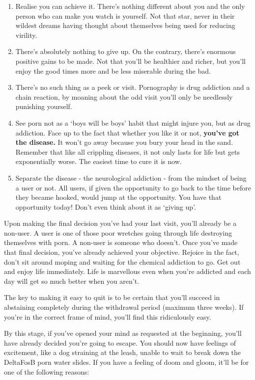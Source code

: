 \documentclass[
]{book}
\begin{document}
\begin{enumerate}
\def\labelenumi{\arabic{enumi}.}
\item
  Realise you can achieve it. There's nothing different about you and the only person who can make you watch is yourself. Not that star, never in their wildest dreams having thought about themselves being used for reducing virility.
\item
  There's absolutely nothing to give up. On the contrary, there's enormous positive gains to be made. Not that you'll be healthier and richer, but you'll enjoy the good times more and be less miserable during the bad.
\item
  There's no such thing as a peek or visit. Pornography is drug addiction and a chain reaction, by moaning about the odd visit you'll only be needlessly punishing yourself.
\item
  See porn not as a `boys will be boys' habit that might injure you, but as drug addiction. Face up to the fact that whether you like it or not, \textbf{you've got the disease.} It won't go away because you bury your head in the sand. Remember that like all crippling diseases, it not only lasts for life but gets exponentially worse. The easiest time to cure it is now.
\item
  Separate the disease - the neurological addiction - from the mindset of being a user or not. All users, if given the opportunity to go back to the time before they became hooked, would jump at the opportunity. You have that opportunity today! Don't even think about it as `giving up'.
\end{enumerate}

Upon making the final decision you've had your last visit, you'll already be a non-user. A user is one of those poor wretches going through life destroying themselves with porn. A non-user is someone who doesn't. Once you've made that final decision, you've already achieved your objective. Rejoice in the fact, don't sit around moping and waiting for the chemical addiction to go. Get out and enjoy life immediately. Life is marvellous even when you're addicted and each day will get so much better when you aren't.

The key to making it easy to quit is to be certain that you'll succeed in abstaining completely during the withdrawal period (maximum three weeks). If you're in the correct frame of mind, you'll find this ridiculously easy.

By this stage, if you've opened your mind as requested at the beginning, you'll have already decided you're going to escape. You should now have feelings of excitement, like a dog straining at the leash, unable to wait to break down the DeltaFosB porn water slides. If you have a feeling of doom and gloom, it'll be for one of the following reasons:
\end{document}
